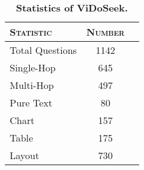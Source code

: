 \begin{table}[!h]
    \small
    \centering
    \caption{\textbf{Statistics of ViDoSeek.}}
    \label{tab:data_statistic}
    \begin{tabular}{lcc}
    \toprule
    \textsc{\textbf{Statistic}} & \textsc{\textbf{Number}}\\
    \midrule
    Total Questions & 1142\\
    \midrule
    Single-Hop & 645 \\
    Multi-Hop & 497 \\
    \midrule
    Pure Text & 80\\
    Chart & 157 \\
    Table & 175 \\
    Layout & 730\\
    \bottomrule
    \end{tabular}
\end{table}